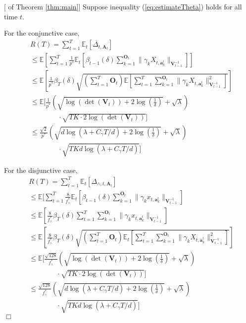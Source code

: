 \documentclass{article}
\newcommand{\EE}{\mathbb{E}}
\newcommand{\bA}{\mathbf{A}}
\newcommand{\ba}{\mathbf{a}}
\newcommand{\bO}{\mathbf{O}}
\newcommand{\bV}{\mathbf{V}}
\newcommand{\norm}[1]{\| #1 \|}
\newenvironment{proof}{\noindent {\textbf{Proof. }}}{$\Box$ \medskip}
\begin{document}
\begin{proof}[ of Theorem \ref{thm:main}]
Suppose inequality (\ref{eq:estimateTheta}) holds for all time $t$. 

For the conjunctive case,
\begin{equation}
\begin{split}
&R(T) =\sum_{t=1}^{T} \EE_{t}[\Delta_{t, \bA_t}] \\
&\leq \EE[\sum_{t=1}^{T} \frac{1}{p^*} \EE_t[\beta_{t-1}(\delta) \sum_{k=1}^{\bO_t}\norm{\gamma_k X_{t,\ba_k^t}}_{\bV_{t-1}^{-1}}]]\\
&\leq \EE[\frac{1}{p^*} \beta_T(\delta) \sqrt{(\sum_{t=1}^{T} \bO_t) \EE[\sum_{t=1}^{T} \sum_{k=1}^{\bO_t}\norm{\gamma_k X_{t,\ba_k^t}}_{\bV_{t-1}^{-1}}^2]} ]  \\
&\leq \EE[\frac{1}{p^*} (\sqrt{\log(\det(\bV_t)) + 2\log(\frac{1}{\delta})} + \sqrt{\lambda}) \\
&\qquad \qquad \cdot \sqrt{TK \cdot 2\log(\det(\bV_t))} ]\\
&\leq \frac{\sqrt{2}}{p^*} (\sqrt{d\log(\lambda + C_\gamma T/d) + 2\log(\frac{1}{\delta})} + \sqrt{\lambda})\\
&\qquad \qquad \cdot \sqrt{TKd\log(\lambda + C_\gamma T/d)} ]
\end{split}
\end{equation}

For the disjunctive case, 
\begin{equation}
\begin{split}
&R(T) =\sum_{t=1}^{T} \EE_{t}[\Delta_{\wedge, t, \bA_t}] \\
&\leq \EE[\sum_{t=1}^{T} \frac{8}{f_{\wedge}^{\ast}} \EE_t[\beta_{t-1}(\delta)\sum_{k=1}^{\bO_t}\norm{\gamma_k x_{t,\ba_k^t}}_{\bV_{t-1}^{-1}}] \\
&\leq \EE[\frac{8}{f_{\wedge}^{\ast}} \beta_{T}(\delta) \sum_{t=1}^{T} \sum_{k=1}^{\bO_t}\norm{\gamma_k x_{t,\ba_k^t}}_{\bV_{t-1}^{-1}}]\\
&\leq \EE[\frac{8}{f_{\wedge}^{\ast}} \beta_{T}(\delta) \sqrt{(\sum_{t=1}^{T} \bO_t) \EE_t[\sum_{t=1}^{T} \sum_{k=1}^{\bO_t}\norm{\gamma_k X_{t,\ba_k^t}}_{\bV_{t-1}^{-1}}^2]}]\\
&\leq \EE[\frac{\sqrt{128}}{f_{\wedge}^{\ast}} (\sqrt{\log(\det(\bV_t)) + 2\log(\frac{1}{\delta})} + \sqrt{\lambda}) \\
&\qquad \qquad \cdot \sqrt{TK \cdot 2\log(\det(\bV_t))} ]\\
&\leq \frac{\sqrt{128}}{f_{\wedge}^{\ast}} (\sqrt{d\log(\lambda + C_\gamma T/d) + 2\log(\frac{1}{\delta})} + \sqrt{\lambda})\\
&\qquad \qquad \cdot \sqrt{TKd\log(\lambda + C_\gamma T/d)} ]
\end{split}
\end{equation}
\end{proof}
	
	
	


	
\end{document}
